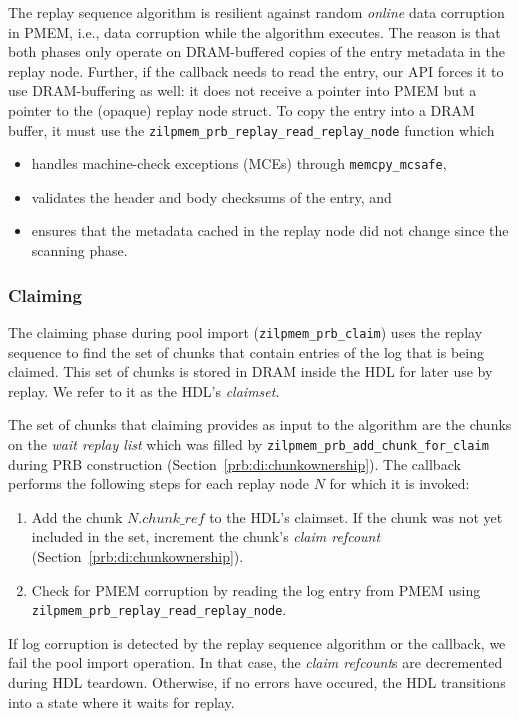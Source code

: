 \documentclass[12pt,a4paper,twoside]{book}
\begin{document}
The replay sequence algorithm is resilient against random \textit{online} data corruption in PMEM, i.e., data corruption while the algorithm executes.
The reason is that both phases only operate on DRAM-buffered copies of the entry metadata in the replay node.
Further, if the callback needs to read the entry, our API forces it to use DRAM-buffering as well:
it does not receive a pointer into PMEM but a pointer to the (opaque) replay node struct.
To copy the entry into a DRAM buffer, it must use the \lstinline{zilpmem_prb_replay_read_replay_node} function which
\begin{itemize}[noitemsep]
    \item handles machine-check exceptions (MCEs) through \lstinline{memcpy_mcsafe},
    \item validates the header and body checksums of the entry, and
    \item ensures that the metadata cached in the replay node did not change since the scanning phase.
\end{itemize}


\subsubsection{Claiming}
The claiming phase during pool import (\lstinline{zilpmem_prb_claim}) uses the replay sequence to find the set of chunks that contain entries of the log that is being claimed.
This set of chunks is stored in DRAM inside the HDL for later use by replay.
We refer to it as the HDL's \textit{claimset}.

The set of chunks that claiming provides as input to the algorithm are the chunks on the \textit{wait replay list} which was filled by \lstinline{zilpmem_prb_add_chunk_for_claim} during PRB construction (Section~\ref{prb:di:chunkownership}).
The callback performs the following steps for each replay node $N$ for which it is invoked:
\begin{enumerate}
    \item Add the chunk $N.chunk\_ref$ to the HDL's claimset.
        If the chunk was not yet included in the set, increment the chunk's \textit{claim refcount} (Section~\ref{prb:di:chunkownership}).
    \item Check for PMEM corruption by reading the log entry from PMEM using \lstinline{zilpmem_prb_replay_read_replay_node}.
\end{enumerate}
If log corruption is detected by the replay sequence algorithm or the callback, we fail the pool import operation.
In that case, the \textit{claim refcount}s are decremented during HDL teardown.
Otherwise, if no errors have occured, the HDL transitions into a state where it waits for replay.
\end{document}
